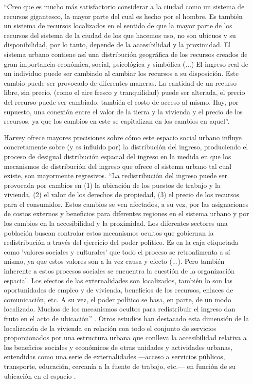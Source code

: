 “Creo que es mucho más satisfactorio considerar a la ciudad como un sistema de recursos gigantesco, la mayor parte del cual es hecho por el hombre. Es también un sistema de recursos localizados en el sentido de que la mayor parte de los recursos del sistema de la ciudad de los que hacemos uso, no son ubicuos y su disponibilidad, por lo tanto, depende de la accesibilidad y la proximidad. El sistema urbano contiene así una distribución geográfica de los recursos creados de gran importancia económica, social, psicológica y simbólica (...) El ingreso real de un individuo puede ser cambiado al cambiar los recursos a su disposición. Este cambio puede ser provocado de diferentes maneras. La cantidad de un recurso libre, sin precio, (como el aire fresco y tranquilidad) puede ser alterada, el precio del recurso puede ser cambiado, también el costo de acceso al mismo. Hay, por supuesto, una conexión entre el valor de la tierra y la vivienda y el precio de los recursos, ya que los cambios en este se capitalizan en los cambios en aquel”\cite[~68]{harvey}.

Harvey ofrece mayores precisiones sobre cómo este espacio social urbano influye concretamente sobre (y es influido por) la distribución del ingreso, produciendo el proceso de desigual distribución espacial del ingreso en la medida en que los mecanismos de distribución del ingreso que ofrece el sistema urbano tal cual existe, son mayormente regresivos. “La redistribución del ingreso puede ser provocada por cambios en (1) la ubicación de los puestos de trabajo y la vivienda, (2) el valor de los derechos de propiedad, (3) el precio de los recursos para el consumidor. Estos cambios se ven afectados, a su vez, por las asignaciones de costos externos y beneficios para diferentes regiones en el sistema urbano y por los cambios en la accesibilidad y la proximidad. Los diferentes sectores una población buscan controlar estos mecanismos ocultos que gobiernan la redistribución a través del ejercicio del poder político. Es en la caja etiquetada como 'valores sociales y culturales' que todo el proceso se retroalimenta a sí mismo, ya que estos valores son a la vez causa y efecto (...). Pero también inherente a estos procesos sociales se encuentra la cuestión de la organización espacial. Los efectos de las externalidades son localizados, también lo son las oportunidades de empleo y de vivienda, beneficios de los recursos, enlaces de comunicación, etc. A su vez, el poder político se basa, en parte, de un modo localizado. Muchos de los mecanismos ocultos para redistribuir el ingreso dan fruto en el acto de ubicación” \cite[p.~86]{harvey}. Otros estudios han destacado esta dimensión de la localización de la vivienda en relación con todo el conjunto de servicios proporcionados por una estructura urbana que conlleva la accesibilidad relativa a los beneficios sociales y económicos de otras unidades y actividades urbanas, entendidas como una serie de externalidades —acceso a servicios públicos, transporte, educación, cercanía a la fuente de trabajo, etc.— en función de su ubicación en el espacio 	\cite{yujnovsky,oszlak}.

